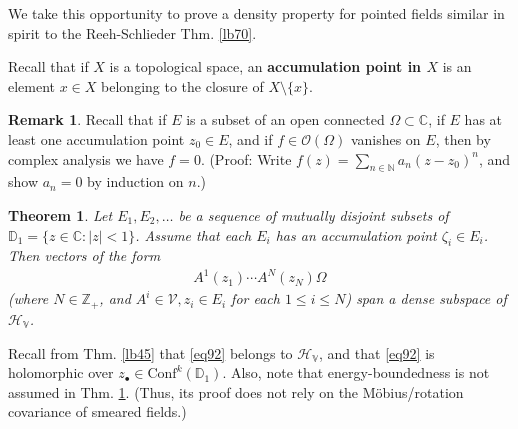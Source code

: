 \documentclass[12pt,b5paper,notitlepage]{article}
\theoremstyle{definition}
\newtheorem{rem}[df]{Remark}
\theoremstyle{plain}
\newtheorem{thm}[df]{Theorem}
\newcommand{\mc}{\mathcal}
\newcommand{\Conf}{\mathrm{Conf}}
\newcommand{\scr}{\mathscr}
\newcommand{\blt}{\bullet}
\newcommand{\Cbb}{\mathbb C}
\newcommand{\Nbb}{\mathbb N}
\newcommand{\Zbb}{\mathbb Z}
\newcommand{\Dbb}{\mathbb D}
\newcommand{\HV}{\mathcal H_{\mathbb V}}
\numberwithin{equation}{section}
\begin{document}
We take this opportunity to prove a density property for pointed fields similar in spirit to the Reeh-Schlieder Thm. \ref{lb70}.


Recall that if $X$ is a topological space, an \textbf{accumulation point in $X$}  is an element $x\in X$ belonging to the closure of $X\setminus\{x\}$. 

\begin{rem}\label{lb71}
Recall that if $E$ is a subset of an open connected $\Omega\subset\Cbb$, if $E$ has at least one accumulation point $z_0\in E$, and if $f\in\scr O(\Omega)$ vanishes on $E$, then by complex analysis we have $f=0$. (Proof: Write $f(z)=\sum_{n\in\Nbb}a_n(z-z_0)^n$, and show $a_n=0$ by induction on $n$.)
\end{rem}


\begin{thm}\label{lb72}
Let $E_1,E_2,\dots$ be a sequence of mutually disjoint subsets of $\Dbb_1=\{z\in\Cbb:|z|<1\}$. Assume that each $E_i$ has an accumulation point $\zeta_i\in E_i$. Then vectors of the form
\begin{align}\label{eq92}
A^1(z_1)\cdots A^N(z_N)\Omega
\end{align}
(where $N\in\Zbb_+$, and $A^i\in\mc V,z_i\in E_i$ for each $1\leq i\leq N$) span a dense subspace of $\HV$.
\end{thm}


Recall from Thm. \ref{lb45} that \eqref{eq92} belongs to $\HV$, and that \eqref{eq92} is holomorphic over $z_\blt\in\Conf^k(\Dbb_1)$. Also, note that energy-boundedness is not assumed in Thm. \ref{lb72}. (Thus, its proof does not rely on the M\"obius/rotation covariance of smeared fields.)
\end{document}

